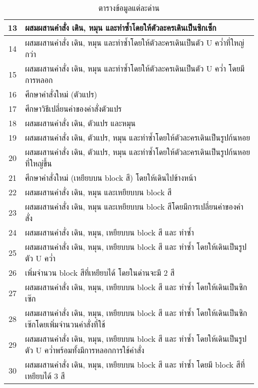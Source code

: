 \begin{center}
\begin{table}
\begin{center}
\begin{tabularx}{\textwidth}{|c | X|}
             \hline
             13 &  ผสมผสานคำสั่ง เดิน, หมุน และทำซ้ำโดยให้ตัวละครเดินเป็นซิกเซ็ก \\ 
             \hline
             14 &  ผสมผสานคำสั่ง เดิน, หมุน และทำซ้ำโดยให้ตัวละครเดินเป็นตัว U คว่ำที่ใหญ่กว่า \\ 
             \hline
             15 &  ผสมผสานคำสั่ง เดิน, หมุน และทำซ้ำโดยให้ตัวละครเดินเป็นตัว U คว่ำ โดยมีการหลอก \\ 
             \hline
             16 &  ศึกษาคำสั่งใหม่ (ตัวแปร) \\ 
             \hline
             17 &  ศึกษาวิธีเปลี่ยนค่าของคำสั่งตัวแปร \\ 
             \hline
             18 &  ผสมผสานคำสั่ง เดิน, ตัวแปร และหมุน \\ 
             \hline
             19 &  ผสมผสานคำสั่ง เดิน, ตัวแปร, หมุน และทำซ้ำโดยให้ตัวละครเดินเป็นรูปก้นหอย \\ 
             \hline
             20 &  ผสมผสานคำสั่ง เดิน, ตัวแปร, หมุน และทำซ้ำโดยให้ตัวละครเดินเป็นรูปก้นหอยที่ใหญ่ขึ้น \\ 
             \hline
             21 &  ศึกษาคำสั่งใหม่ (เหยียบบน block สี) โดยให้เดินไปข้างหน้า \\ 
             \hline
             22 &  ผสมผสานคำสั่ง เดิน, หมุน และเหยียบบน block สี \\ 
             \hline
             23 &  ผสมผสานคำสั่ง เดิน, หมุน และเหยียบบน block สีโดยมีการเปลี่ยนค่าของคำสั่ง \\ 
             \hline
             24 &  ผสมผสานคำสั่ง เดิน, หมุน, เหยียบบน block สี และ ทำซ้ำ \\ 
             \hline
             25 &  ผสมผสานคำสั่ง เดิน, หมุน, เหยียบบน block สี และ ทำซ้ำ โดยให้เดินเป็นรูปตัว U คว่ำ \\ 
             \hline
             26 &  เพิ่มจำนวน block สีที่เหยียบได้ โดยในด่านจะมี 2 สี \\ 
             \hline
             27 &  ผสมผสานคำสั่ง เดิน, หมุน, เหยียบบน block สี และ ทำซ้ำ โดยให้เดินเป็นซิกเซ๊ก \\ 
             \hline
             28 &  ผสมผสานคำสั่ง เดิน, หมุน, เหยียบบน block สี และ ทำซ้ำ โดยให้เดินเป็นซิกเซ๊กโดยเพิ่มจำนวนคำสั่งที่ใช้ \\ 
             \hline
             29 &  ผสมผสานคำสั่ง เดิน, หมุน, เหยียบบน block สี และ ทำซ้ำ โดยให้เดินเป็นรูปตัว U คว่ำพร้อมทั้งมีการหลอกการใช้คำสั่ง \\ 
             \hline
             30 &  ผสมผสานคำสั่ง เดิน, หมุน, เหยียบบน block สี และ ทำซ้ำ โดยมี block สีที่เหยียบได้ 3 สี \\ 
             \hline
            \end{tabularx}
        \end{center}
        \caption[ตารางข้อมูลแต่ละด่าน]{ตารางข้อมูลแต่ละด่าน}
        \label{maptable}
    \end{table}
\end{center}
